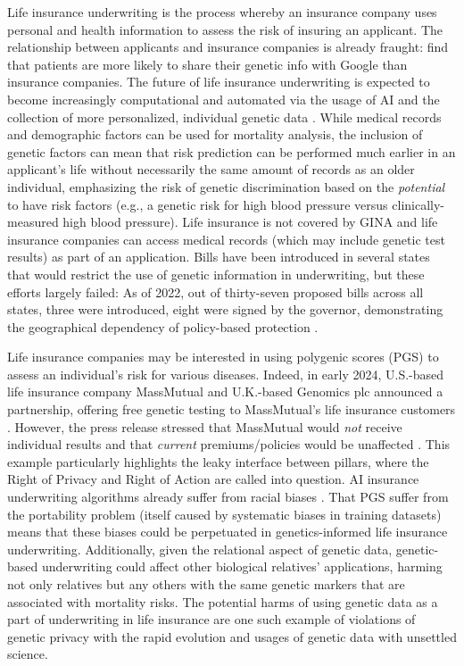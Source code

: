 Life insurance underwriting is the process whereby an insurance company uses personal and health information to assess the risk of insuring an applicant. The relationship between applicants and insurance companies is already fraught: \cite{devnos_genomics_2016} find that patients are more likely to share their genetic info with Google than insurance companies. The future of life insurance underwriting is expected to become increasingly computational and automated via the usage of AI and the collection of more personalized, individual genetic data \cite{filabi_ai-enabled_2021, balasubramanian_insurance_nodate, rothstein_time_2018, koleva-kolarova_financing_2022}. While medical records and demographic factors can be used for mortality analysis, the inclusion of genetic factors can mean that risk prediction can be performed much earlier in an applicant's life without necessarily the same amount of records as an older individual, emphasizing the risk of genetic discrimination \cite{karlsson_linner_genetic_2022} based on the \textit{potential} to have risk factors (e.g., a genetic risk for high blood pressure versus clinically-measured high blood pressure). Life insurance is not covered by GINA and life insurance companies can access medical records (which may include genetic test results) as part of an application. Bills have been introduced in several states that would restrict the use of genetic information in underwriting, but these efforts largely failed: As of 2022, out of thirty-seven proposed bills across all states, three were introduced, eight were signed by the governor, demonstrating the geographical dependency of policy-based protection \cite{vermont_legislature_httpslegislaturevermontgovdocuments2022workgroupshouse20commercegenetic20testingwitness20documentswjill20rickardgenetic20testing20legislation20across20states4-20-2022pdf_nodate}.

Life insurance companies may be interested in using polygenic scores (PGS) to assess an individual's risk for various diseases. Indeed, in early 2024, U.S.-based life insurance company MassMutual and U.K.-based Genomics plc announced a partnership, offering free genetic testing to MassMutual's life insurance customers \cite{massmutual_genomics_2024}. However, the press release stressed that MassMutual would \textit{not} receive individual results and that \textit{current} premiums/policies would be unaffected \cite{massmutual_genomics_2024}. This example particularly highlights the leaky interface between pillars, where the Right of Privacy and Right of Action are called into question. AI insurance underwriting algorithms already suffer from racial biases \cite{lee_ai_2022}. That PGS suffer from the portability problem (itself caused by systematic biases in training datasets) means that these biases could be perpetuated in genetics-informed life insurance underwriting. Additionally, given the relational aspect of genetic data, genetic-based underwriting could affect other biological relatives' applications, harming not only relatives but any others with the same genetic markers that are associated with mortality risks. The potential harms of using genetic data as a part of underwriting in life insurance are one such example of violations of genetic privacy with the rapid evolution and usages of genetic data with unsettled science. 